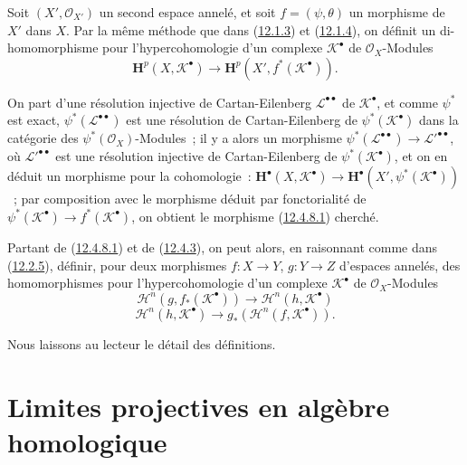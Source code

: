 \begin{env}[12.4.8]
\label{0.12.4.8-fr}
Soit $(X',\mathcal O_{X'})$ un second espace annelé, et soit
$f=(\psi,\theta)$ un morphisme de $X'$ dans $X$. Par la même méthode que
dans (\hyperref[0.12.1.3-fr]{12.1.3}) et
(\hyperref[0.12.1.4-fr]{12.1.4}), on définit un di-homomorphisme pour
l'hypercohomologie d'un complexe $\mathcal K^\bullet$ de
$\mathcal O_X$-Modules
\begin{equation}
\label{0.12.4.8.1-fr}
\tag{12.4.8.1}
\mathbf H^p(X,\mathcal K^\bullet)
\longrightarrow\mathbf H^p(X',f^*(\mathcal K^\bullet)).
\end{equation}

On part d'une résolution injective de Cartan-Eilenberg
$\mathcal L^{\bullet\bullet}$ de $\mathcal K^\bullet$, et comme $\psi^*$
est exact, $\psi^*(\mathcal L^{\bullet\bullet})$ est une résolution de
Cartan-Eilenberg de $\psi^*(\mathcal K^\bullet)$ dans la catégorie des
$\psi^*(\mathcal O_X)$-Modules~; il y a alors un morphisme
$\psi^*(\mathcal L^{\bullet\bullet})\to
\mathcal L'^{\bullet\bullet}$, où $\mathcal L'^{\bullet\bullet}$ est une
résolution injective de Cartan-Eilenberg de
$\psi^*(\mathcal K^\bullet)$, et on en déduit un morphisme pour la
cohomologie~: $\mathbf H^\bullet(X,\mathcal K^\bullet)\longrightarrow\mathbf H^\bullet(X',\psi^*(\mathcal K^\bullet))$~;
par composition avec le morphisme déduit par fonctorialité de
$\psi^*(\mathcal K^\bullet)\to f^*(\mathcal K^\bullet)$, on obtient le
morphisme (\hyperref[0.12.4.8.1-fr]{12.4.8.1}) cherché.

Partant de (\hyperref[0.12.4.8.1-fr]{12.4.8.1}) et de
(\hyperref[0.12.4.3-fr]{12.4.3}), on peut alors, en raisonnant comme dans
(\hyperref[0.12.2.5-fr]{12.2.5}), définir, pour deux morphismes
$f:X\to Y$, $g:Y\to Z$ d'espaces annelés, des homomorphismes pour
l'hypercohomologie d'un complexe $\mathcal K^\bullet$ de
$\mathcal O_X$-Modules
\begin{equation}
\label{0.12.4.8.2-fr}
\tag{12.4.8.2}
\mathscr H^n(g,f_*(\mathcal K^\bullet))
\longrightarrow\mathscr H^n(h,\mathcal K^\bullet)
\end{equation}
\begin{equation}
\label{0.12.4.8.3-fr}
\tag{12.4.8.3}
\mathscr H^n(h,\mathcal K^\bullet)
\longrightarrow g_*(\mathscr H^n(f,\mathcal K^\bullet)).
\end{equation}

Nous laissons au lecteur le détail des définitions.
\end{env}

\section{Limites projectives en algèbre homologique}
\label{section:0.13-fr}


